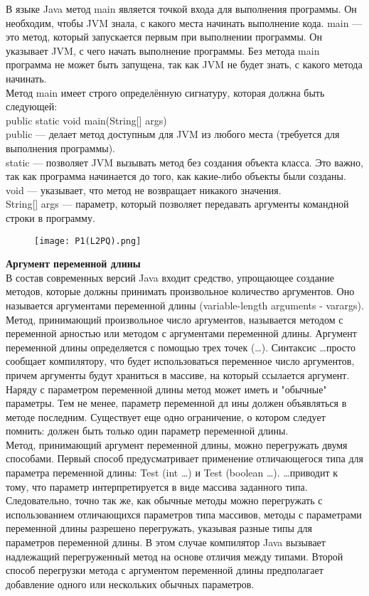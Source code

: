 \noindent В языке Java метод main является точкой входа для выполнения программы. Он необходим, чтобы JVM знала, с какого места начинать выполнение кода. main — это метод, который запускается первым при выполнении программы. Он указывает JVM, с чего начать выполнение программы. Без метода main программа не может быть запущена, так как JVM не будет знать, с какого метода начинать. \\
Метод main имеет строго определённую сигнатуру, которая должна быть следующей: \\
public static void main(String[] args) \\
public — делает метод доступным для JVM из любого места (требуется для выполнения программы). \\
static — позволяет JVM вызывать метод без создания объекта класса. Это важно, так как программа начинается до того, как какие-либо объекты были созданы. \\
void — указывает, что метод не возвращает никакого значения. \\
String[] args — параметр, который позволяет передавать аргументы командной строки в программу. \\
\begin{figure}[H]
    \centering
    \texttt{[image: P1(L2PQ).png]}
    \label{fig:enter-label}
\end{figure}
\noindent \textbf{Аргумент переменной длины} \\
В состав современных версий Java входит средство, упрощающее создание методов, которые должны принимать произвольное количество аргументов. Оно называется аргументами переменной длины (variable-length arguments - varargs). Метод, принимающий произвольное число аргументов, называется методом с переменной арностью или методом с аргументами переменной длины. Аргумент переменной длины определяется с помощью трех точек (\ldots). Синтаксис \ldots просто сообщает компилятору, что будет использоваться переменное число аргументов, причем аргументы будут храниться в массиве, на который ссылается аргумент. Наряду с параметром переменной длины метод может иметь и "обычные"\,
параметры. Тем не менее, параметр переменной дл ины должен объявляться в методе последним. Существует еще одно ограничение, о котором следует помнить: должен быть только один параметр переменной длины. \\
Метод, принимающий аргумент переменной длины, можно перегружать двумя способами. Первый способ предусматривает применение отличающегося типа для параметра переменной длины: Test (int \ldots ) и Test (boolean \ldots ). \ldots приводит к тому, что параметр интерпретируется в виде массива заданного типа. Следовательно, точно так же, как обычные методы можно перегружать
с использованием отличающихся параметров типа массивов, методы с параметрами переменной длины разрешено перегружать, указывая разные типы для параметров переменной длины. В этом случае компилятор Java вызывает надлежащий перегруженный метод на основе отличия между типами. Второй способ перегрузки метода с аргументом переменной длины предполагает добавление одного или нескольких обычных параметров.
\newpage
